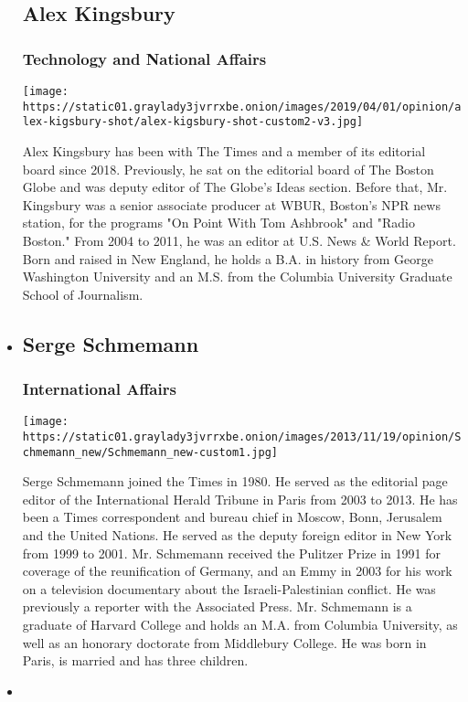 \begin{itemize}
{  \subsection{Alex Kingsbury}\label{alex-kingsbury}}

  \hypertarget{technology-and-national-affairs}{%
  \subsubsection{Technology and National
  Affairs}\label{technology-and-national-affairs}}

  \texttt{[image: https://static01.graylady3jvrrxbe.onion/images/2019/04/01/opinion/alex-kigsbury-shot/alex-kigsbury-shot-custom2-v3.jpg]}

  Alex Kingsbury has been with The Times and a member of its editorial
  board since 2018. Previously, he sat on the editorial board of The
  Boston Globe and was deputy editor of The Globe's Ideas section.
  Before that, Mr. Kingsbury was a senior associate producer at WBUR,
  Boston's NPR news station, for the programs "On Point With Tom
  Ashbrook" and "Radio Boston." From 2004 to 2011, he was an editor at
  U.S. News \& World Report. Born and raised in New England, he holds a
  B.A. in history from George Washington University and an M.S. from the
  Columbia University Graduate School of Journalism.
\item
  \hypertarget{serge-schmemann}{%
  \subsection{Serge Schmemann}\label{serge-schmemann}}

  \hypertarget{international-affairs}{%
  \subsubsection{International Affairs}\label{international-affairs}}

  \texttt{[image: https://static01.graylady3jvrrxbe.onion/images/2013/11/19/opinion/Schmemann\_new/Schmemann\_new-custom1.jpg]}

  Serge Schmemann joined the Times in 1980. He served as the editorial
  page editor of the International Herald Tribune in Paris from 2003 to
  2013. He has been a Times correspondent and bureau chief in Moscow,
  Bonn, Jerusalem and the United Nations. He served as the deputy
  foreign editor in New York from 1999 to 2001. Mr. Schmemann received
  the Pulitzer Prize in 1991 for coverage of the reunification of
  Germany, and an Emmy in 2003 for his work on a television documentary
  about the Israeli-Palestinian conflict. He was previously a reporter
  with the Associated Press. Mr. Schmemann is a graduate of Harvard
  College and holds an M.A. from Columbia University, as well as an
  honorary doctorate from Middlebury College. He was born in Paris, is
  married and has three children.
\item
  \hypertarget{brent-staples}{%
}
\end{itemize}
